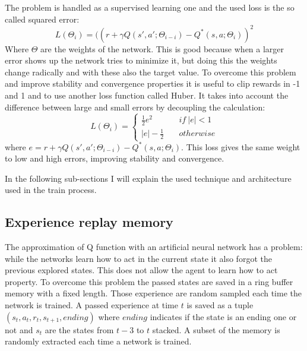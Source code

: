 \documentclass[10pt]{article}
\begin{document}
\begin{multicols}{2}
The problem is handled as a supervised learning one and the used loss is the so called squared error: 
\[
L(\Theta_i) = ((r + \gamma Q(s', a';\Theta_{i-i})- Q^*(s, a;\Theta_{i} ))^2
\]
Where $\Theta$ are the weights of the network. 
This is good because when a larger error shows up the network tries to minimize it, but doing this the weights change radically and with these also the target value. To overcome this problem and improve stability and convergence properties it is useful to clip rewards in -1 and 1 and to use another loss function called Huber. It takes into account the difference between large and small errors by decoupling the calculation: 
\[
 L(\Theta_i)=\left\{
 \begin{array}{ll}
 \frac{1}{2}e^2  & \quad	  if \:|e| < 1 \\
 |e| - \frac{1}{2} & \quad otherwise
 \end{array}
 \right.
\] 
where $e = r + \gamma Q(s', a';\Theta_{i-i})- Q^*(s, a;\Theta_{i} )$. This loss gives the same weight to low and high errors, improving stability and convergence.  

In the following sub-sections I will explain the used technique and architecture used in the train process. 

\subsection{Experience replay memory}
The approximation of Q function with an artificial neural network has a problem: while the networks learn how to act in the current state it also forgot the previous explored states. This does not allow the agent to learn how to act property. To overcome this problem the passed states are saved in a ring buffer memory with a fixed length. Those experience are random sampled each time the network is trained. A passed experience at time $t$ is saved as a tuple $(s_t, a_t, r_t, s_{t+1}, ending)$ where $ending$ indicates if the state is an ending one or not and $s_t$ are the states from $t-3$ to $t$ stacked. A subset of the memory is randomly extracted each time a network is trained. 


\end{multicols}
\end{document}
